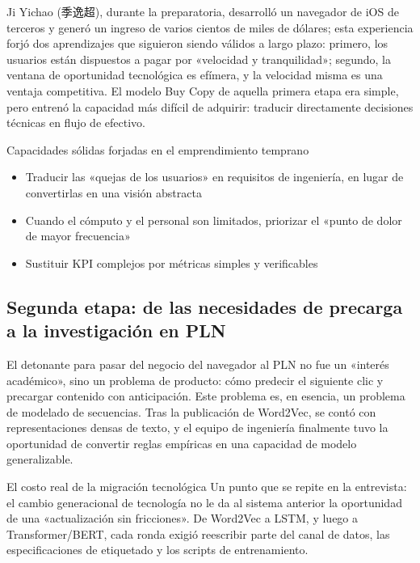 \documentclass[a4paper]{article}
\begin{document}
Ji Yichao (季逸超), durante la preparatoria, desarrolló un navegador de iOS de terceros y generó un ingreso de varios cientos de miles de dólares; esta experiencia forjó dos aprendizajes que siguieron siendo válidos a largo plazo: primero, los usuarios están dispuestos a pagar por «velocidad y tranquilidad»; segundo, la ventana de oportunidad tecnológica es efímera, y la velocidad misma es una ventaja competitiva. El modelo Buy Copy de aquella primera etapa era simple, pero entrenó la capacidad más difícil de adquirir: traducir directamente decisiones técnicas en flujo de efectivo.

\begin{importantbox}{Capacidades sólidas forjadas en el emprendimiento temprano}
\begin{itemize}
    \item Traducir las «quejas de los usuarios» en requisitos de ingeniería, en lugar de convertirlas en una visión abstracta
    \item Cuando el cómputo y el personal son limitados, priorizar el «punto de dolor de mayor frecuencia»
    \item Sustituir KPI complejos por métricas simples y verificables
\end{itemize}
\end{importantbox}

\subsection{Segunda etapa: de las necesidades de precarga a la investigación en PLN}

El detonante para pasar del negocio del navegador al PLN no fue un «interés académico», sino un problema de producto: cómo predecir el siguiente clic y precargar contenido con anticipación. Este problema es, en esencia, un problema de modelado de secuencias. Tras la publicación de Word2Vec, se contó con representaciones densas de texto, y el equipo de ingeniería finalmente tuvo la oportunidad de convertir reglas empíricas en una capacidad de modelo generalizable.

\begin{knowledgebox}{El costo real de la migración tecnológica}
Un punto que se repite en la entrevista: el cambio generacional de tecnología no le da al sistema anterior la oportunidad de una «actualización sin fricciones». De Word2Vec a LSTM, y luego a Transformer/BERT, cada ronda exigió reescribir parte del canal de datos, las especificaciones de etiquetado y los scripts de entrenamiento.
\end{knowledgebox}
\end{document}
